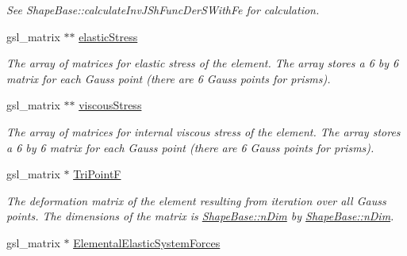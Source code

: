 \begin{DoxyCompactItemize}
\begin{DoxyCompactList}\small\item\em See Shape\+Base\+::calculate\+Inv\+J\+Sh\+Func\+Der\+S\+With\+Fe for calculation. \end{DoxyCompactList}\item 
\hypertarget{classShapeBase_acd549e0086d16194ae389ae528969596}{}gsl\+\_\+matrix $\ast$$\ast$ \hyperlink{classShapeBase_acd549e0086d16194ae389ae528969596}{elastic\+Stress}\label{classShapeBase_acd549e0086d16194ae389ae528969596}

\begin{DoxyCompactList}\small\item\em The array of matrices for elastic stress of the element. The array stores a 6 by 6 matrix for each Gauss point (there are 6 Gauss points for prisms). \end{DoxyCompactList}\item 
\hypertarget{classShapeBase_a95733061efc2a6645fecfe5c0aa1dd93}{}gsl\+\_\+matrix $\ast$$\ast$ \hyperlink{classShapeBase_a95733061efc2a6645fecfe5c0aa1dd93}{viscous\+Stress}\label{classShapeBase_a95733061efc2a6645fecfe5c0aa1dd93}

\begin{DoxyCompactList}\small\item\em The array of matrices for internal viscous stress of the element. The array stores a 6 by 6 matrix for each Gauss point (there are 6 Gauss points for prisms). \end{DoxyCompactList}\item 
\hypertarget{classShapeBase_ab7ac8f14929ab37e8eae5fcaf93b18a8}{}gsl\+\_\+matrix $\ast$ \hyperlink{classShapeBase_ab7ac8f14929ab37e8eae5fcaf93b18a8}{Tri\+Point\+F}\label{classShapeBase_ab7ac8f14929ab37e8eae5fcaf93b18a8}

\begin{DoxyCompactList}\small\item\em The deformation matrix of the element resulting from iteration over all Gauss points. The dimensions of the matrix is \hyperlink{classShapeBase_a250bd3396546342c8104f5b9c180d18f}{Shape\+Base\+::n\+Dim} by \hyperlink{classShapeBase_a250bd3396546342c8104f5b9c180d18f}{Shape\+Base\+::n\+Dim}. \end{DoxyCompactList}\item 
\hypertarget{classShapeBase_a94d201c88c73283f2e9711d1cc038e02}{}gsl\+\_\+matrix $\ast$ \hyperlink{classShapeBase_a94d201c88c73283f2e9711d1cc038e02}{Elemental\+Elastic\+System\+Forces}\label{classShapeBase_a94d201c88c73283f2e9711d1cc038e02}


\end{DoxyCompactItemize}
